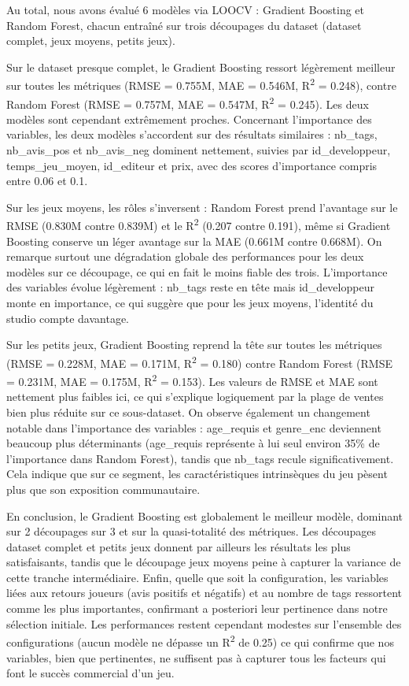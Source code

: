 \documentclass[mstat,12pt]{unswthesis}
\begin{document}
Au total, nous avons évalué 6 modèles via LOOCV : Gradient Boosting et Random Forest, chacun entraîné sur trois découpages du dataset (dataset complet, jeux moyens, petits jeux).

Sur le dataset presque complet, le Gradient Boosting ressort légèrement meilleur sur toutes les métriques (RMSE = 0.755M, MAE = 0.546M, R\textsuperscript{2} = 0.248), contre Random Forest (RMSE = 0.757M, MAE = 0.547M, R\textsuperscript{2} = 0.245). Les deux modèles sont cependant extrêmement proches. Concernant l'importance des variables, les deux modèles s'accordent sur des résultats similaires : nb\_tags, nb\_avis\_pos et nb\_avis\_neg dominent nettement, suivies par id\_developpeur, temps\_jeu\_moyen, id\_editeur et prix, avec des scores d'importance compris entre 0.06 et 0.1.

Sur les jeux moyens, les rôles s'inversent : Random Forest prend l'avantage sur le RMSE (0.830M contre 0.839M) et le R\textsuperscript{2} (0.207 contre 0.191), même si Gradient Boosting conserve un léger avantage sur la MAE (0.661M contre 0.668M). On remarque surtout une dégradation globale des performances pour les deux modèles sur ce découpage, ce qui en fait le moins fiable des trois. L'importance des variables évolue légèrement : nb\_tags reste en tête mais id\_developpeur monte en importance, ce qui suggère que pour les jeux moyens, l'identité du studio compte davantage.

Sur les petits jeux, Gradient Boosting reprend la tête sur toutes les métriques (RMSE = 0.228M, MAE = 0.171M, R\textsuperscript{2} = 0.180) contre Random Forest (RMSE = 0.231M, MAE = 0.175M, R\textsuperscript{2} = 0.153). Les valeurs de RMSE et MAE sont nettement plus faibles ici, ce qui s'explique logiquement par la plage de ventes bien plus réduite sur ce sous-dataset. On observe également un changement notable dans l'importance des variables : age\_requis et genre\_enc deviennent beaucoup plus déterminants (age\_requis représente à lui seul environ 35\% de l'importance dans Random Forest), tandis que nb\_tags recule significativement. Cela indique que sur ce segment, les caractéristiques intrinsèques du jeu pèsent plus que son exposition communautaire.

En conclusion, le Gradient Boosting est globalement le meilleur modèle, dominant sur 2 découpages sur 3 et sur la quasi-totalité des métriques. Les découpages dataset complet et petits jeux donnent par ailleurs les résultats les plus satisfaisants, tandis que le découpage jeux moyens peine à capturer la variance de cette tranche intermédiaire. Enfin, quelle que soit la configuration, les variables liées aux retours joueurs (avis positifs et négatifs) et au nombre de tags ressortent comme les plus importantes, confirmant a posteriori leur pertinence dans notre sélection initiale. Les performances restent cependant modestes sur l'ensemble des configurations (aucun modèle ne dépasse un R\textsuperscript{2} de 0.25) ce qui confirme que nos variables, bien que pertinentes, ne suffisent pas à capturer tous les facteurs qui font le succès commercial d'un jeu.
\end{document}
